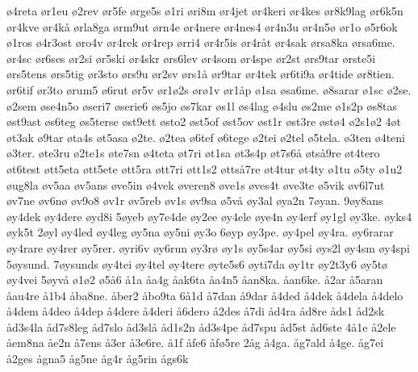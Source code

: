 {^^f84reta
^^f8r1eu
^^f82rev
^^f8r5fe
^^f8rge5s
^^f81ri
^^f8ri8m
^^f8r4jet
^^f8r4keri
^^f8r4kes
^^f8r8k9lag
^^f8r6k5n
^^f8r4kve
^^f8r4k^^e5
^^f8rla8ga
^^f8rm9ut
^^f8rn4e
^^f8r4nere
^^f8r4nes4
^^f8r4n3u
^^f8r4n5^^f8
^^f8r1o
^^f85r6ok
^^f81ros
^^f84r3ost
^^f8ro4v
^^f8r4rek
^^f8r4rep
^^f8rri4
^^f8r4r5is
^^f8r4r^^e5t
^^f8r4sak
^^f8rsa8ka
^^f8rsa6me.
^^f8r4sc
^^f8r6ses
^^f8r2si
^^f8r5ski
^^f8r4skr
^^f8rs6lev
^^f8r4som
^^f8r4spe
^^f8r2st
^^f8rs9tar
^^f8rste5i
^^f8rs5tens
^^f8rs5tig
^^f8r3sto
^^f8rs9u
^^f8r2sv
^^f8rs1^^e5
^^f8r9tar
^^f8r4tek
^^f8r6ti9a
^^f8r4tide
^^f8r8tien.
^^f8r6tif
^^f8r3to
^^f8rum5
^^f86rut
^^f8r5v
^^f8r1^^f82s
^^f8r^^f81v
^^f8r1^^e5p
^^f81sa
^^f8sa6me.
^^f88sarar
^^f81sc
^^f82se.
^^f82sem
^^f8se4n5o
^^f8seri7
^^f8serie6
^^f8s5jo
^^f8s7kar
^^f8s1l
^^f8s4lag
^^f84slu
^^f8s2me
^^f81s2p
^^f8s8tas
^^f8st9ast
^^f8s6teg
^^f8s5terse
^^f8st9ett
^^f8sto2
^^f8st5of
^^f8st5ov
^^f8st1r
^^f8st3re
^^f8st^^f84
^^f82s1^^f82
4^^f8t
^^f8t3ak
^^f89tar
^^f8ta4s
^^f8t5asa
^^f82te.
^^f82tea
^^f86tef
^^f86tege
^^f82tei
^^f82tel
^^f85tela.
^^f83ten
^^f84teni
^^f83ter.
^^f8te3ru
^^f82te1s
^^f8te7sn
^^f84teta
^^f8t7ri
^^f8t1sa
^^f8t3s4p
^^f8t7s6^^e5
^^f8ts^^e59re
^^f8t4tero
^^f8t6test
^^f8tt5eta
^^f8tt5ete
^^f8tt5ra
^^f8tt7ri
^^f8tt1s2
^^f8tts^^e57re
^^f8t4tur
^^f8t4ty
^^f81tu
^^f85ty
^^f81u2
^^f8ug8la
^^f8v5aa
^^f8v5ans
^^f8ve5in
^^f84vek
^^f8veren8
^^f8ve1s
^^f8ves4t
^^f8ve3te
^^f85vik
^^f8v6l7ut
^^f8v7ne
^^f8v6n^^f8
^^f8v9o8
^^f8v1r
^^f8v5reb
^^f8v1s
^^f8v9sa
^^f85v^^e5
^^f8y3al
^^f8ya2n
7^^f8yan.
9^^f8y8ans
^^f8y4dek
^^f8y4dere
^^f8yd8i
5^^f8yeb
^^f8y7e4de
^^f8y2ee
^^f8y4ele
^^f8ye4n
^^f8y4erf
^^f8y1gl
^^f8y3ke.
^^f8yks4
^^f8yk5t
2^^f8yl
^^f8y4led
^^f8y4leg
^^f8y5na
^^f8y5ni
^^f8y3o
6^^f8yp
^^f8y3pe.
^^f8y4pel
^^f8y4ra.
^^f8y6rarar
^^f8y4rare
^^f8y4rer
^^f8y5rer.
^^f8yri6v
^^f8y6run
^^f8y3r^^f8
^^f8y1s
^^f8y5s4ar
^^f8y5si
^^f8ys2l
^^f8y4sm
^^f8y4spi
5^^f8ysund.
7^^f8ysunds
^^f8y4tei
^^f8y4tel
^^f8y4tere
^^f8yte5s6
^^f8yti7da
^^f8y1tr
^^f8y2t3y6
^^f8y5t^^f8
^^f8y4vei
5^^f8yv^^e5
^^f81^^f82
^^f85^^e56
^^e51a
^^e5a4g
^^e5ak6ta
^^e5a4n5
^^e5an8ka.
^^e5an6ke.
^^e52ar
^^e55aran
^^e5au4re
^^e51b4
^^e5ba8ne.
^^e5ber2
^^e5bo9ta
6^^e51d
^^e57dan
^^e59dar
^^e54ded
^^e54dek
^^e54dela
^^e54delo
^^e54dem
^^e54deo
^^e54dep
^^e54dere
^^e54deri
^^e56dero
^^e52des
^^e57di
^^e5d4ra
^^e5d8re
^^e5ds1
^^e5d2sk
^^e5d3s4la
^^e5d7s8leg
^^e5d7slo
^^e5d3sl^^e5
^^e5d1s2n
^^e5d3s4pe
^^e5d7spu
^^e5d5st
^^e5d6ste
4^^e51e
^^e52ele
^^e5em8na
^^e5e2n
^^e57ens
^^e53er
^^e53e6re.
^^e51f
^^e5fe6
^^e5f^^f85re
2^^e5g
^^e54ga.
^^e5g7ald
^^e54ge.
^^e5g7ei
^^e52ges
^^e5gna5
^^e5g5ne
^^e5g4r
^^e5g5rin
^^e5gs6k
}
